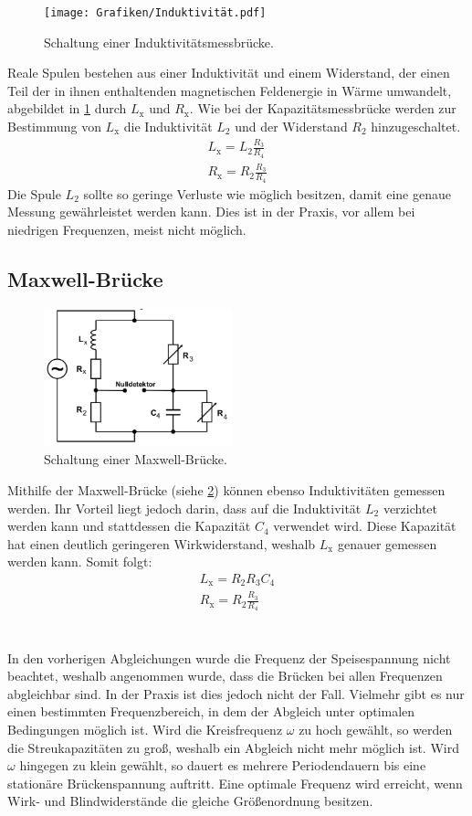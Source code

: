 \begin{figure}[h]
  \centering
  \texttt{[image: Grafiken/Induktivität.pdf]}
  \caption{Schaltung einer Induktivitätsmessbrücke. \cite{1}}
  \label{fig:Induktivität}
\end{figure}
Reale Spulen bestehen aus einer Induktivität und einem Widerstand, der einen Teil der in ihnen enthaltenden magnetischen Feldenergie in Wärme umwandelt, abgebildet in \ref{fig:Induktivität} durch $L_\text{x}$ und $R_\text{x}$. Wie bei der Kapazitätsmessbrücke werden zur Bestimmung von $L_\text{x}$ die Induktivität $L_2$ und der Widerstand $R_2$ hinzugeschaltet.
\begin{gather}
	L_\text{x} = L_2\frac{R_3}{R_4} \\
	R_\text{x} = R_2\frac{R_3}{R_4}
\end{gather}
Die Spule $L_2$ sollte so geringe Verluste wie möglich besitzen, damit eine genaue Messung gewährleistet werden kann. Dies ist in der Praxis, vor allem bei niedrigen Frequenzen, meist nicht möglich.

\subsection{Maxwell-Brücke}

\begin{figure}[h]
  \centering
  \includegraphics[height=4cm]{Grafiken/Maxwell.pdf}
  \caption{Schaltung einer Maxwell-Brücke. \cite{1}}
  \label{fig:Maxwell}
\end{figure}
Mithilfe der Maxwell-Brücke (siehe \ref{fig:Maxwell}) können ebenso Induktivitäten gemessen werden. Ihr Vorteil liegt jedoch darin, dass auf die Induktivität $L_2$ verzichtet werden kann und stattdessen die Kapazität $C_4$ verwendet wird. Diese Kapazität hat einen deutlich geringeren Wirkwiderstand, weshalb $L_\text{x}$ genauer gemessen werden kann. 
Somit folgt:
\begin{gather}
	L_\text{x} = R_2R_3C_4 \\
	R_\text{x} = R_2\frac{R_3}{R_4}
\end{gather}
\\
\\
In den vorherigen Abgleichungen wurde die Frequenz der Speisespannung nicht beachtet, weshalb angenommen wurde, dass die Brücken bei allen Frequenzen abgleichbar sind. In der Praxis ist dies jedoch nicht der Fall. Vielmehr gibt es nur einen bestimmten Frequenzbereich, in dem der Abgleich unter optimalen Bedingungen möglich ist. Wird die Kreisfrequenz $\omega$ zu hoch gewählt, so werden die Streukapazitäten zu groß, weshalb ein Abgleich nicht mehr möglich ist. Wird $\omega$ hingegen zu klein gewählt, so dauert es mehrere Periodendauern bis eine stationäre Brückenspannung auftritt. 
Eine optimale Frequenz wird erreicht, wenn Wirk- und Blindwiderstände die gleiche Größenordnung besitzen.

